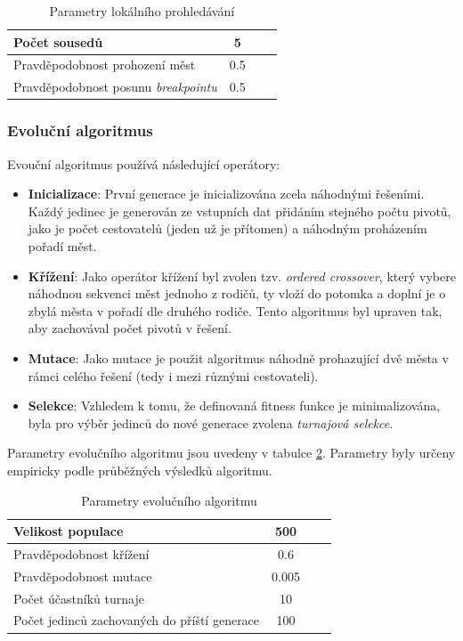 \documentclass[journal]{IEEEtrancz}
\begin{document}
\begin{table}
  \centering
  \caption{Parametry lokálního prohledávání}
  \begin{tabular}{|l||c|c|c|}
  \hline
  Počet sousedů  & 5 \\
  \hline
  Pravděpodobnost prohození měst  & 0.5 \\
  \hline
  Pravděpodobnost posunu \textit{breakpointu}  & 0.5 \\
  \hline
  \end{tabular}
  \label{tab:local-search}
\end{table}

\bigskip
\subsubsection{Evoluční algoritmus}
\label{sec:ea}
Evouční algoritmus používá následující operátory: 
\begin{itemize}
  \item{\textbf{Inicializace}}: První generace je inicializována zcela náhodnými řešeními. Každý jedinec je generován ze vstupních dat přidáním stejného počtu pivotů, jako je počet cestovatelů (jeden už je přítomen) a náhodným proházením pořadí měst.
  \item{\textbf{Křížení}}: Jako operátor křížení byl zvolen tzv. \textit{ordered crossover}, který vybere náhodnou sekvenci měst jednoho z rodičů, ty vloží do potomka a doplní je o zbylá města v pořadí dle druhého rodiče. Tento algoritmus byl upraven tak, aby zachovával počet pivotů v řešení.
  \item{\textbf{Mutace}}: Jako mutace je použit algoritmus náhodně prohazující dvě města v rámci celého řešení (tedy i mezi různými cestovateli).
  \item{\textbf{Selekce}}: Vzhledem k tomu, že definovaná fitness funkce je minimalizována, byla pro výběr jedinců do nové generace zvolena \textit{turnajová selekce}.
\end{itemize}  

Parametry evolučního algoritmu jsou uvedeny v tabulce \ref{tab:ea}. Parametry byly určeny empiricky podle průběžných výsledků algoritmu.

\begin{table}
  \centering
  \caption{Parametry evolučního algoritmu}
  \begin{tabular}{|l||c|c|c|}
  \hline
   Velikost populace  & 500 \\
  \hline
   Pravděpodobnost křížení & 0.6 \\
  \hline
   Pravděpodobnost mutace & 0.005 \\
  \hline
   Počet účastníků turnaje & 10 \\
  \hline
   Počet jedinců zachovaných do příští generace & 100 \\
  \hline
  \end{tabular}
  \label{tab:ea}
\end{table}
\end{document}
